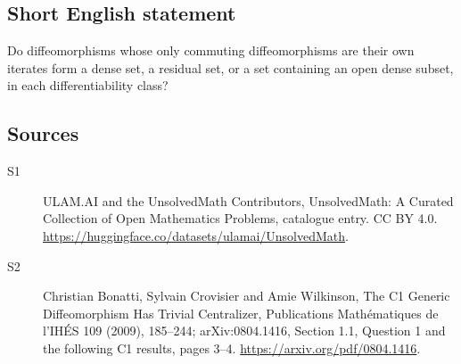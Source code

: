 \documentclass[11pt]{article}
\begin{document}
\subsection{Short English statement}
Do diffeomorphisms whose only commuting diffeomorphisms are their own iterates form a dense set, a residual set, or a set containing an open dense subset, in each differentiability class?
\subsection{Sources}
\begin{description}
\item[\hypertarget{source:statement:1}{S1}] ULAM.AI and the UnsolvedMath Contributors, UnsolvedMath: A Curated Collection of Open Mathematics Problems, catalogue entry. CC BY 4.0. \url{https://huggingface.co/datasets/ulamai/UnsolvedMath}.
\item[\hypertarget{source:statement:2}{S2}] Christian Bonatti, Sylvain Crovisier and Amie Wilkinson, The C1 Generic Diffeomorphism Has Trivial Centralizer, Publications Mathématiques de l’IHÉS 109 (2009), 185--244; arXiv:0804.1416, Section 1.1, Question 1 and the following C1 results, pages 3--4. \url{https://arxiv.org/pdf/0804.1416}.
\end{description}
\label{end:statement}
\end{document}
